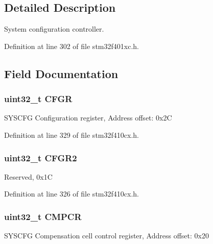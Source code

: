 \subsection{Detailed Description}
System configuration controller. 

Definition at line 302 of file stm32f401xc.\+h.



\subsection{Field Documentation}
\subsubsection[{\texorpdfstring{C\+F\+GR}{CFGR}}]{ uint32\+\_\+t C\+F\+GR}\hypertarget{struct_s_y_s_c_f_g___type_def_a26f1e746ccbf9c9f67e7c60e61085ec1}{}\label{struct_s_y_s_c_f_g___type_def_a26f1e746ccbf9c9f67e7c60e61085ec1}
S\+Y\+S\+C\+FG Configuration register, Address offset\+: 0x2C 

Definition at line 329 of file stm32f410cx.\+h.

\subsubsection[{\texorpdfstring{C\+F\+G\+R2}{CFGR2}}]{\setlength{\rightskip}{0pt plus 5cm}uint32\+\_\+t C\+F\+G\+R2}\hypertarget{struct_s_y_s_c_f_g___type_def_aa9c12d51311ff64cc0b667e695e7f850}{}\label{struct_s_y_s_c_f_g___type_def_aa9c12d51311ff64cc0b667e695e7f850}
Reserved, 0x1C 

Definition at line 326 of file stm32f410cx.\+h.

\subsubsection[{\texorpdfstring{C\+M\+P\+CR}{CMPCR}}]{ uint32\+\_\+t C\+M\+P\+CR}\hypertarget{struct_s_y_s_c_f_g___type_def_a08ddbac546fa9928256654d31255c8c3}{}\label{struct_s_y_s_c_f_g___type_def_a08ddbac546fa9928256654d31255c8c3}
S\+Y\+S\+C\+FG Compensation cell control register, Address offset\+: 0x20 

